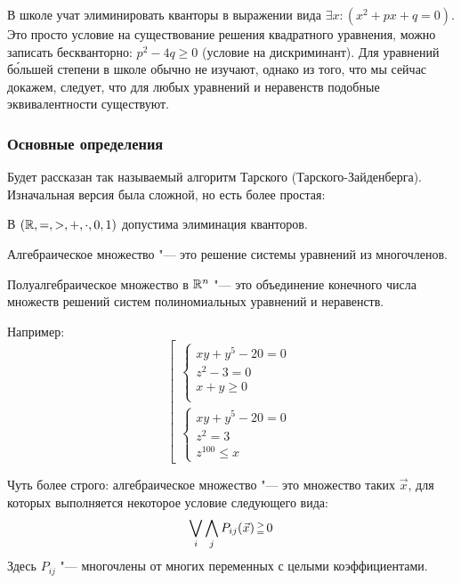 	\begin{exmp}
	В школе учат элиминировать кванторы в выражении вида $\exists x \colon (x^2 + px + q = 0)$.
	Это просто условие на существование решения квадратного уравнения, можно записать бескванторно: $p^2-4q \ge 0$ (условие на дискриминант).
	Для уравнений б\'ольшей степени в школе обычно не изучают, однако из того, что мы сейчас докажем,
	следует, что для любых уравнений и неравенств подобные эквивалентности существуют.
	\end{exmp}

\subsubsection{Основные определения}
	Будет рассказан так называемый алгоритм Тарского (Тарского-Зайденберга).
	Изначальная версия была сложной, но есть более простая:
	\begin{theorem}\label{tarski_seidenberg}
		В $(\mathbb{R}, =, >, +, \cdot, 0, 1)$ допустима элиминация кванторов.
	\end{theorem}

	\begin{Def}
		Алгебраическое множество "--- это решение системы уравнений из многочленов.
	\end{Def}

	\begin{Def}
		Полуалгебраическое множество в $\mathbb{R}^n$ "--- это объединение конечного числа
		множеств решений систем полиномиальных уравнений и неравенств.
	\end{Def}
	\begin{Rem}
		Например:
		\[
			\left[
			\begin{array}{l}
				\begin{cases}
					xy+y^5 - 20 = 0 \\
					z^2 - 3 = 0 \\
					x + y \ge 0 \\
				\end{cases}\\
				\begin{cases}
					xy+y^5 - 20 = 0 \\
					z^2 = 3 \\
					z^{100} \le x
				\end{cases}
			\end{array}
			\right.
		\]
	\end{Rem}
	\begin{Rem}
		Чуть более строго: алгебраическое множество "--- это множество таких $\vec x$, для которых выполняется некоторое условие следующего вида:
		\[ \bigvee_i \bigwedge_j P_{ij}(\vec x) \begin{smallmatrix}>\\=\end{smallmatrix} 0 \]
		Здесь $P_{ij}$ "--- многочлены от многих переменных с целыми коэффициентами.
	\end{Rem}

